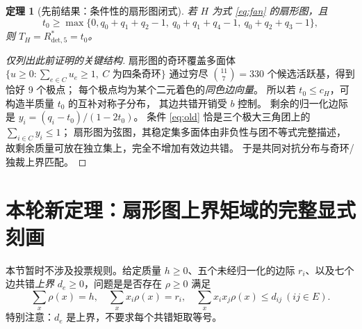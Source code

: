 \documentclass[11pt,a4paper]{ctexart}
\newtheorem{theorem}{定理}[section]
\theoremstyle{remark}\newtheorem{remark}[theorem]{说明}
\newcommand{\Rdet}{R^*_{\mathrm{det},5}}
\newcommand{\Tc}{T_H}
\begin{document}
\begin{theorem}[先前结果：条件性的扇形图闭式]\label{thm:old}
若 $H$ 为式 \eqref{eq:fan} 的扇形图，且
\begin{equation}\label{eq:old}
t_0\ge\max\{0,q_0+q_1+q_2-1,\ q_0+q_1+q_4-1,\ q_0+q_2+q_3-1\},
\end{equation}
则 $\Tc=\Rdet=t_0$。
\end{theorem}
\begin{proof}[仅列出此前证明的关键结构]
扇形图的奇环覆盖多面体
$\{u\ge0:\sum_{e\in C}u_e\ge1,\ C\text{ 为四条奇环}\}$
通过穷尽 $\binom{11}{7}=330$ 个候选活跃基，得到恰好 9 个极点；
每个极点均为某个二元着色的\emph{同色边向量}。
所以若 $t_0\le c_H$，可构造半质量 $t_0$ 的互补对称子分布，
其边共错开销受 $b$ 控制。
剩余的归一化边际是
$y_i=(q_i-t_0)/(1-2t_0)$。
条件 \eqref{eq:old} 恰是三个极大三角团上的
$\sum_{i\in C}y_i\le1$；
扇形图为弦图，其稳定集多面体由非负性与团不等式完整描述，
故剩余质量可放在独立集上，完全不增加有效边共错。
于是共同对抗分布与奇环/独裁上界匹配。
\end{proof}

\section{本轮新定理：扇形图上界矩域的完整显式刻画}
\label{sec:cap}
本节暂时不涉及投票规则。给定质量 $h\ge0$、五个未经归一化的边际
$r_i$、以及七个边共错\emph{上界} $d_e\ge0$，问题是是否存在
$\rho\ge0$ 满足
\[
\sum_x\rho(x)=h,\quad\sum_x x_i\rho(x)=r_i,\quad
\sum_xx_ix_j\rho(x)\le d_{ij}\ (ij\in E).
\]
特别注意：$d_e$ 是上界，不要求每个共错矩取等号。
\end{document}
